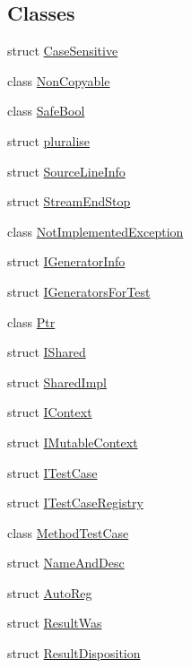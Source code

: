 \subsection*{Classes}
\begin{DoxyCompactItemize}
\item 
struct \hyperlink{structCatch_1_1CaseSensitive}{Case\-Sensitive}
\item 
class \hyperlink{classCatch_1_1NonCopyable}{Non\-Copyable}
\item 
class \hyperlink{classCatch_1_1SafeBool}{Safe\-Bool}
\item 
struct \hyperlink{structCatch_1_1pluralise}{pluralise}
\item 
struct \hyperlink{structCatch_1_1SourceLineInfo}{Source\-Line\-Info}
\item 
struct \hyperlink{structCatch_1_1StreamEndStop}{Stream\-End\-Stop}
\item 
class \hyperlink{classCatch_1_1NotImplementedException}{Not\-Implemented\-Exception}
\item 
struct \hyperlink{structCatch_1_1IGeneratorInfo}{I\-Generator\-Info}
\item 
struct \hyperlink{structCatch_1_1IGeneratorsForTest}{I\-Generators\-For\-Test}
\item 
class \hyperlink{classCatch_1_1Ptr}{Ptr}
\item 
struct \hyperlink{structCatch_1_1IShared}{I\-Shared}
\item 
struct \hyperlink{structCatch_1_1SharedImpl}{Shared\-Impl}
\item 
struct \hyperlink{structCatch_1_1IContext}{I\-Context}
\item 
struct \hyperlink{structCatch_1_1IMutableContext}{I\-Mutable\-Context}
\item 
struct \hyperlink{structCatch_1_1ITestCase}{I\-Test\-Case}
\item 
struct \hyperlink{structCatch_1_1ITestCaseRegistry}{I\-Test\-Case\-Registry}
\item 
class \hyperlink{classCatch_1_1MethodTestCase}{Method\-Test\-Case}
\item 
struct \hyperlink{structCatch_1_1NameAndDesc}{Name\-And\-Desc}
\item 
struct \hyperlink{structCatch_1_1AutoReg}{Auto\-Reg}
\item 
struct \hyperlink{structCatch_1_1ResultWas}{Result\-Was}
\item 
struct \hyperlink{structCatch_1_1ResultDisposition}{Result\-Disposition}
\item 

\end{DoxyCompactItemize}
